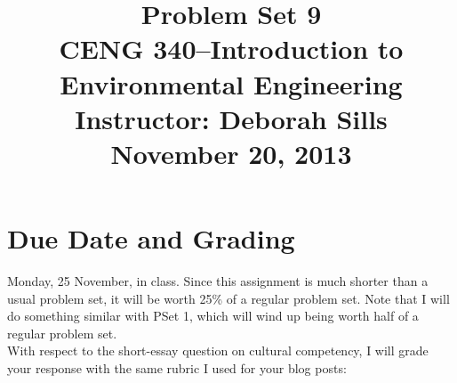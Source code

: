 \documentclass[12pt,letterpaper]{article}
\begin{document}
\setlength{\parindent}{0cm} 


\frenchspacing


\title {\Large{\textbf{Problem Set 9}}\\ \large{CENG 340--Introduction to Environmental Engineering\\
Instructor: Deborah Sills\\ \textbf{November 20, 2013}}}

\author {}
\date {}
\maketitle

\vspace{-1in}
\section *{Due Date and Grading}
Monday, 25 November, in class. Since this assignment is much shorter than a usual problem set, it will be worth 25\% of a regular problem set.  Note that I will do something similar with PSet 1, which will wind up being worth half of a regular problem set.\\

With respect to the short-essay question on cultural competency, I will grade your response with the same rubric I used for your blog posts:
\end{document}
